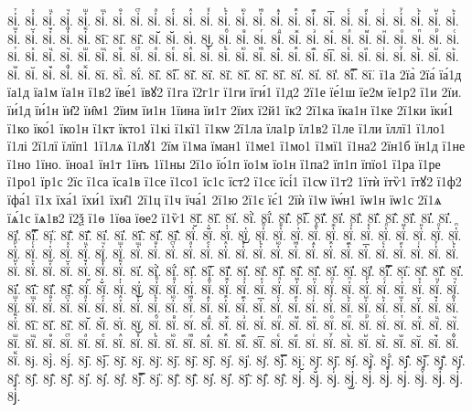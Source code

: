 {8і҆ⷮ.
8і҆ⷯ.
8і҆ⷰ.
8і҆ⷱ.
8і҆ⷲ.
8і҆ⷳ.
8і҆ⷴ.
8і҆ⷵ.
8і҆ⷶ.
8і҆ⷷ.
8і҆ⷸ.
8і҆ⷹ.
8і҆ⷺ.
8і҆ⷻ.
8і҆ⷼ.
8і҆ⷽ.
8і҆ⷾ.
8і҆ⷿ.
8і҆꙯.
8і҆ꙴ.
8і҆ꙵ.
8і҆ꙶ.
8і҆ꙷ.
8і҆ꙸ.
8і҆ꙹ.
8і҆ꙺ.
8і҆ꙻ.
8і҆꙼.
8і҆꙽.
8і҆ꚞ.
8і҆ꚟ.
8і҇.
8і᷀.
8і᷁.
8і᷶.
8і᷷.
8і᷸.
8і᷹.
8іⷠ.
8іⷡ.
8іⷢ.
8іⷣ.
8іⷤ.
8іⷥ.
8іⷦ.
8іⷧ.
8іⷨ.
8іⷩ.
8іⷪ.
8іⷫ.
8іⷬ.
8іⷭ.
8іⷮ.
8іⷯ.
8іⷰ.
8іⷱ.
8іⷲ.
8іⷳ.
8іⷴ.
8іⷵ.
8іⷶ.
8іⷷ.
8іⷸ.
8іⷹ.
8іⷺ.
8іⷻ.
8іⷼ.
8іⷽ.
8іⷾ.
8іⷿ.
8і꙯.
8іꙴ.
8іꙵ.
8іꙶ.
8іꙷ.
8іꙸ.
8іꙹ.
8іꙺ.
8іꙻ.
8і꙼.
8і꙽.
8іꚞ.
8іꚟ.
8ї.
8ї̀.
8ї́.
8ї̂.
8ї̅.
8ї̆.
8ї̇.
8ї̈.
8ї̋.
8ї̏.
8ї̑.
8ї̓.
8ї̔.
8ї̾.
8ї̿.
8ї͘.
ї1а
2їа̀
2їа́
їа́1д
їа1д
їа1м
їа1н
ї1в2
їве́1
ївꙋ2
ї1га
ї2г1г
ї1ги
їги́1
ї1д2
2ї1е
їе́1ш
їе2м
їе1р2
ї1и
2їи.
їи́1д
їи́1н
їи̑2
їи̑м1
2їим
їи1н
1їина
їи1т
2їих
ї2й1
їк2
2ї1ка
їка1н
ї1ке
2ї1ки
їки́1
ї1ко
їко́1
їко1н
ї1кт
їкто1
ї1кі
ї1кї1
ї1кѡ
2ї1ла
їла1р
їл1в2
ї1ле
ї1ли
їллї1
ї1ло1
ї1лі
2ї1лї
їлїп1
1ї1лѧ
ї1лꙋ1
2їм
ї1ма
їман1
ї1ме1
ї1мо1
ї1мї1
ї1на2
2їн1б
їн1д
ї1не
ї1но
1їно.
їноа1
їн1т
1їнъ
1ї1ны
2ї1о
їо́1п
їо1м
їо1н
ї1па2
їп1п
їпїо1
ї1ра
ї1ре
ї1ро1
їр1с
2їс
ї1са
їса1в
ї1се
ї1со1
їс1с
їст2
ї1сє
їсі́1
ї1сѡ
ї1т2
1їтѝ
їтѷ1
їтꙋ2
ї1ф2
їфа́1
ї1х
їха́1
їхи́1
їхи̑1
2ї1ц
ї1ч
їча́1
2ї1ю
2ї1є
їє́1
2їѝ
ї1ѡ
їѡ́н1
їѡ1н
їѡ1с
2ї1ѧ
їѧ́1с
їѧ1в2
ї2ѯ
ї1ѳ
1їѳа
їѳе2
ї1ѷ1
8ї҃.
8ї҄.
8ї҅.
8ї҅̀.
8ї҅́.
8ї҅̂.
8ї҅̅.
8ї҅̆.
8ї҅̇.
8ї҅̈.
8ї҅̋.
8ї҅̏.
8ї҅̑.
8ї҅̓.
8ї҅̔.
8ї҅̾.
8ї҅̿.
8ї҅͘.
8ї҅҃.
8ї҅҄.
8ї҅҅.
8ї҅҆.
8ї҅҇.
8ї҅᷀.
8ї҅᷁.
8ї҅᷶.
8ї᷷҅.
8ї᷸҅.
8ї᷹҅.
8ї҅ⷠ.
8ї҅ⷡ.
8ї҅ⷢ.
8ї҅ⷣ.
8ї҅ⷤ.
8ї҅ⷥ.
8ї҅ⷦ.
8ї҅ⷧ.
8ї҅ⷨ.
8ї҅ⷩ.
8ї҅ⷪ.
8ї҅ⷫ.
8ї҅ⷬ.
8ї҅ⷭ.
8ї҅ⷮ.
8ї҅ⷯ.
8ї҅ⷰ.
8ї҅ⷱ.
8ї҅ⷲ.
8ї҅ⷳ.
8ї҅ⷴ.
8ї҅ⷵ.
8ї҅ⷶ.
8ї҅ⷷ.
8ї҅ⷸ.
8ї҅ⷹ.
8ї҅ⷺ.
8ї҅ⷻ.
8ї҅ⷼ.
8ї҅ⷽ.
8ї҅ⷾ.
8ї҅ⷿ.
8ї҅꙯.
8ї҅ꙴ.
8ї҅ꙵ.
8ї҅ꙶ.
8ї҅ꙷ.
8ї҅ꙸ.
8ї҅ꙹ.
8ї҅ꙺ.
8ї҅ꙻ.
8ї҅꙼.
8ї҅꙽.
8ї҅ꚞ.
8ї҅ꚟ.
8ї҆.
8ї҆̀.
8ї҆́.
8ї҆̂.
8ї҆̅.
8ї҆̆.
8ї҆̇.
8ї҆̈.
8ї҆̋.
8ї҆̏.
8ї҆̑.
8ї҆̓.
8ї҆̔.
8ї҆̾.
8ї҆̿.
8ї҆͘.
8ї҆҃.
8ї҆҄.
8ї҆҅.
8ї҆҆.
8ї҆҇.
8ї҆᷀.
8ї҆᷁.
8ї҆᷶.
8ї᷷҆.
8ї᷸҆.
8ї᷹҆.
8ї҆ⷠ.
8ї҆ⷡ.
8ї҆ⷢ.
8ї҆ⷣ.
8ї҆ⷤ.
8ї҆ⷥ.
8ї҆ⷦ.
8ї҆ⷧ.
8ї҆ⷨ.
8ї҆ⷩ.
8ї҆ⷪ.
8ї҆ⷫ.
8ї҆ⷬ.
8ї҆ⷭ.
8ї҆ⷮ.
8ї҆ⷯ.
8ї҆ⷰ.
8ї҆ⷱ.
8ї҆ⷲ.
8ї҆ⷳ.
8ї҆ⷴ.
8ї҆ⷵ.
8ї҆ⷶ.
8ї҆ⷷ.
8ї҆ⷸ.
8ї҆ⷹ.
8ї҆ⷺ.
8ї҆ⷻ.
8ї҆ⷼ.
8ї҆ⷽ.
8ї҆ⷾ.
8ї҆ⷿ.
8ї҆꙯.
8ї҆ꙴ.
8ї҆ꙵ.
8ї҆ꙶ.
8ї҆ꙷ.
8ї҆ꙸ.
8ї҆ꙹ.
8ї҆ꙺ.
8ї҆ꙻ.
8ї҆꙼.
8ї҆꙽.
8ї҆ꚞ.
8ї҆ꚟ.
8ї҇.
8ї᷀.
8ї᷁.
8ї᷶.
8ї᷷.
8ї᷸.
8ї᷹.
8їⷠ.
8їⷡ.
8їⷢ.
8їⷣ.
8їⷤ.
8їⷥ.
8їⷦ.
8їⷧ.
8їⷨ.
8їⷩ.
8їⷪ.
8їⷫ.
8їⷬ.
8їⷭ.
8їⷮ.
8їⷯ.
8їⷰ.
8їⷱ.
8їⷲ.
8їⷳ.
8їⷴ.
8їⷵ.
8їⷶ.
8їⷷ.
8їⷸ.
8їⷹ.
8їⷺ.
8їⷻ.
8їⷼ.
8їⷽ.
8їⷾ.
8їⷿ.
8ї꙯.
8їꙴ.
8їꙵ.
8їꙶ.
8їꙷ.
8їꙸ.
8їꙹ.
8їꙺ.
8їꙻ.
8ї꙼.
8ї꙽.
8їꚞ.
8їꚟ.
8ј.
8ј̀.
8ј́.
8ј̂.
8ј̅.
8ј̆.
8ј̇.
8ј̈.
8ј̋.
8ј̏.
8ј̑.
8ј̓.
8ј̔.
8ј̾.
8ј̿.
8ј͘.
8ј҃.
8ј҄.
8ј҅.
8ј҅̀.
8ј҅́.
8ј҅̂.
8ј҅̅.
8ј҅̆.
8ј҅̇.
8ј҅̈.
8ј҅̋.
8ј҅̏.
8ј҅̑.
8ј҅̓.
8ј҅̔.
8ј҅̾.
8ј҅̿.
8ј҅͘.
8ј҅҃.
8ј҅҄.
8ј҅҅.
8ј҅҆.
8ј҅҇.
8ј҅᷀.
8ј҅᷁.
8ј҅᷶.
8ј᷷҅.
8ј᷸҅.
8ј᷹҅.
8ј҅ⷠ.
8ј҅ⷡ.
8ј҅ⷢ.
8ј҅ⷣ.
8ј҅ⷤ.
8ј҅ⷥ.
8ј҅ⷦ.
}
